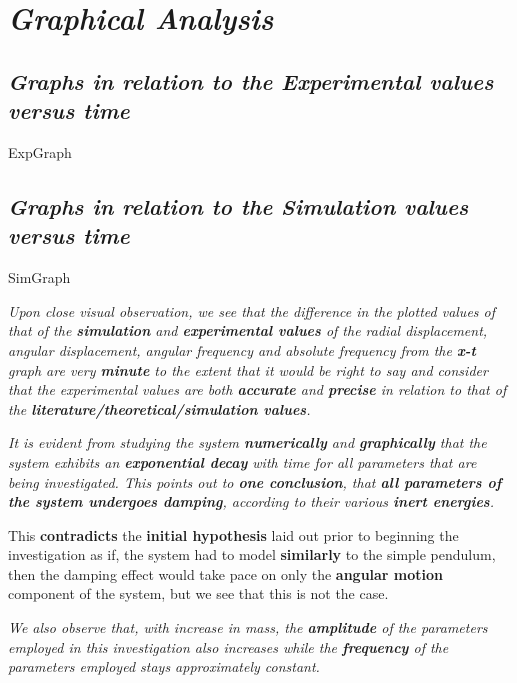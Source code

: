 \section{\textit{Graphical Analysis}}
            
    \subsection{\textit{Graphs in relation to the Experimental values versus time}}
            
        {ExpGraph}
            
    \subsection{\textit{Graphs in relation to the Simulation values versus time}}
            
        {SimGraph}
            
            
    \textit{Upon close visual observation, we see that the difference in the plotted values of that of the \textbf{simulation} and \textbf{experimental values} of the radial displacement, angular displacement, angular frequency and absolute frequency from the \textbf{x-t} graph are very \textbf{minute} to the extent that it would be right to say and consider that the experimental values are both \textbf{accurate} and \textbf{precise} in relation to that of the \textbf{literature/theoretical/simulation values}.}
        
	\textit{It is evident from studying the system \textbf{numerically} and \textbf{graphically} that the system exhibits an \textbf{exponential decay} with time for all parameters that are being investigated. This points out to \textbf{one conclusion}, that \textbf{all parameters of the system undergoes damping}, according to their various \textbf{inert energies}.}
	 
	{This \textbf{contradicts} the \textbf{initial hypothesis} laid out prior to beginning the investigation as if, the system had to model \textbf{similarly} to the simple pendulum, then the damping effect would take pace on only the \textbf{angular motion} component of the system, but we see that this is not the case.}        
        
    \textit{We also observe that, with increase in mass, the \textbf{amplitude} of the parameters employed in this investigation also increases while the \textbf{frequency} of the parameters employed stays approximately constant.}
        
    
    

